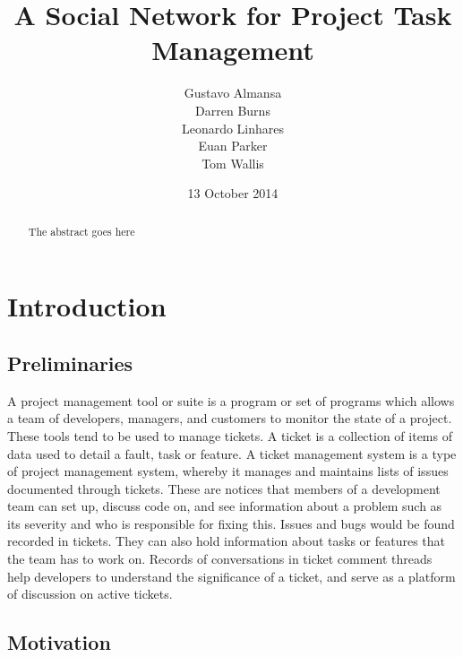 \documentclass[a4paper]{l3proj}
\begin{document}
\title{A Social Network for Project Task Management}
\author{Gustavo Almansa\\
      Darren Burns \\
      Leonardo Linhares \\
      Euan Parker \\
	  Tom Wallis \\
}
\date{13 October 2014}
\maketitle
\begin{abstract}

The abstract goes here

\end{abstract}
\educationalconsent
\tableofcontents
\chapter{Introduction}
\label{intro}

\section{Preliminaries}
\label{preliminaries}
A project management tool or suite is a program or set of programs which allows a team of developers, managers, and customers to monitor the state of a project. These tools tend to be used to manage tickets. A ticket is a collection of items of data used to detail a fault, task or feature.  A ticket management system is a type of project management system, whereby it manages and maintains lists of issues documented through tickets. These are notices that members of a development team can set up, discuss code on, and see information about a problem such as its severity and who is responsible for fixing this. Issues and bugs would be found recorded in tickets. They can also hold information about tasks or features that the team has to work on. Records of conversations in ticket comment threads help developers to understand the significance of a ticket, and serve as a platform of discussion on active tickets.


\section{Motivation}
\label{motivation}
\end{document}
